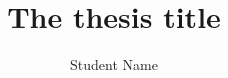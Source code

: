\documentclass [PhD] {umbthes}
\title          {The thesis title}
\author         {Student Name}
\begin{document}
\makeintropages



% 
% 



 

\end{document}
